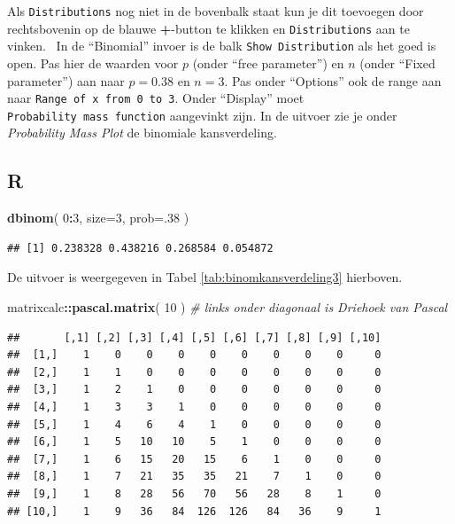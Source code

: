 \documentclass[
]{book}
\newenvironment{Shaded}{\begin{snugshade}}{\end{snugshade}}
\newcommand{\CommentTok}[1]{\textcolor[rgb]{0.56,0.35,0.01}{\textit{#1}}}
\newcommand{\DataTypeTok}[1]{\textcolor[rgb]{0.13,0.29,0.53}{#1}}
\newcommand{\DecValTok}[1]{\textcolor[rgb]{0.00,0.00,0.81}{#1}}
\newcommand{\KeywordTok}[1]{\textcolor[rgb]{0.13,0.29,0.53}{\textbf{#1}}}
\newcommand{\NormalTok}[1]{#1}
\newcommand{\OperatorTok}[1]{\textcolor[rgb]{0.81,0.36,0.00}{\textbf{#1}}}
\begin{document}
Als \texttt{Distributions} nog niet in de bovenbalk staat kun je dit toevoegen door rechtsbovenin op de blauwe \textbf{+}-button te klikken en \texttt{Distributions} aan te vinken.~
In de ``Binomial'' invoer is de balk \texttt{Show\ Distribution} als het goed is open. Pas hier de waarden voor \(p\) (onder ``free parameter'') en \(n\) (onder ``Fixed parameter'') aan naar \(p=0.38\) en \(n=3\). Pas onder ``Options'' ook de range aan naar \texttt{Range\ of\ x\ from\ 0\ to\ 3}. Onder ``Display'' moet \texttt{Probability\ mass\ function} aangevinkt zijn. In de uitvoer zie je onder \emph{Probability Mass Plot} de binomiale kansverdeling.

\hypertarget{r-4}{%
\subsection{R}\label{r-4}}

\begin{Shaded}
\begin{Highlighting}[]
\KeywordTok{dbinom}\NormalTok{( }\DecValTok{0}\OperatorTok{:}\DecValTok{3}\NormalTok{, }\DataTypeTok{size=}\DecValTok{3}\NormalTok{, }\DataTypeTok{prob=}\NormalTok{.}\DecValTok{38}\NormalTok{ )}
\end{Highlighting}
\end{Shaded}

\begin{verbatim}
## [1] 0.238328 0.438216 0.268584 0.054872
\end{verbatim}

De uitvoer is weergegeven in Tabel \ref{tab:binomkansverdeling3} hierboven.

\begin{Shaded}
\begin{Highlighting}[]
\NormalTok{matrixcalc}\OperatorTok{::}\KeywordTok{pascal.matrix}\NormalTok{( }\DecValTok{10}\NormalTok{ ) }\CommentTok{\# links onder diagonaal is Driehoek van Pascal}
\end{Highlighting}
\end{Shaded}

\begin{verbatim}
##       [,1] [,2] [,3] [,4] [,5] [,6] [,7] [,8] [,9] [,10]
##  [1,]    1    0    0    0    0    0    0    0    0     0
##  [2,]    1    1    0    0    0    0    0    0    0     0
##  [3,]    1    2    1    0    0    0    0    0    0     0
##  [4,]    1    3    3    1    0    0    0    0    0     0
##  [5,]    1    4    6    4    1    0    0    0    0     0
##  [6,]    1    5   10   10    5    1    0    0    0     0
##  [7,]    1    6   15   20   15    6    1    0    0     0
##  [8,]    1    7   21   35   35   21    7    1    0     0
##  [9,]    1    8   28   56   70   56   28    8    1     0
## [10,]    1    9   36   84  126  126   84   36    9     1
\end{verbatim}
\end{document}

